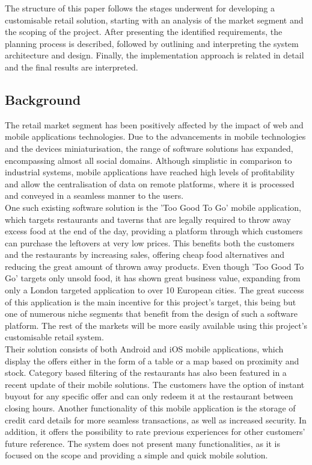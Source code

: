 The structure of this paper follows the stages underwent for developing a customisable retail solution, starting with an analysis of the market segment and the scoping of the project. After presenting the identified requirements, the planning process is described, followed by outlining and interpreting the system architecture and design. Finally, the implementation approach is related in detail and the final results are interpreted.

\subsection{Background} \label{sub:background}

The retail market segment has been positively affected by the impact of web and mobile applications technologies. Due to the advancements in mobile technologies and the devices miniaturisation, the range of software solutions has expanded, encompassing almost all social domains. Although simplistic in comparison to industrial systems, mobile applications have reached high levels of profitability and allow the centralisation of data on remote platforms, where it is processed and conveyed in a seamless manner to the users.\\

One such existing software solution is the 'Too Good To Go'\cite{too_good_to_go} mobile application, which targets restaurants and taverns that are legally required to throw away excess food at the end of the day, providing a platform through which customers can purchase the leftovers at very low prices. This benefits both the customers and the restaurants by increasing sales, offering cheap food alternatives and reducing the great amount of thrown away products. Even though 'Too Good To Go' targets only unsold food, it has shown great business value, expanding from only a London targeted application to over 10 European cities. The great success of this application is the main incentive for this project's target, this being but one of numerous niche segments that benefit from the design of such a software platform. The rest of the markets will be more easily available using this project's customisable retail system.\\

Their solution consists of both Android and iOS mobile applications, which display the offers either in the form of a table or a map based on proximity and stock. Category based filtering of the restaurants has also been featured in a recent update of their mobile solutions. The customers have the option of instant buyout for any specific offer and can only redeem it at the restaurant between closing hours. Another functionality of this mobile application is the storage of credit card details for more seamless transactions, as well as increased security. In addition, it offers the possibility to rate previous experiences for other customers' future reference. The system does not present many functionalities, as it is focused on the scope and providing a simple and quick mobile solution.\\

